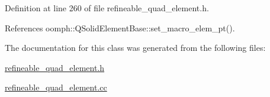 Definition at line 260 of file refineable\+\_\+quad\+\_\+element.\+h.



References oomph\+::\+Q\+Solid\+Element\+Base\+::set\+\_\+macro\+\_\+elem\+\_\+pt().



The documentation for this class was generated from the following files\+:\begin{DoxyCompactItemize}
\item 
\hyperlink{refineable__quad__element_8h}{refineable\+\_\+quad\+\_\+element.\+h}\item 
\hyperlink{refineable__quad__element_8cc}{refineable\+\_\+quad\+\_\+element.\+cc}\end{DoxyCompactItemize}
